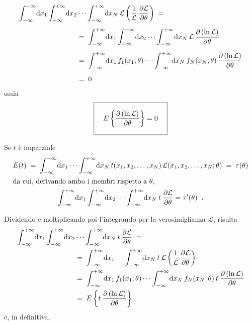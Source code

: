 \begin{equation*}
  \begin{split}
    \int_{-\infty}^{+\infty} \! \de x_1
      \int_{-\infty}^{+\infty} \! \de x_2 &\cdots
      \int_{-\infty}^{+\infty} \! \de x_N \:
      \mathcal{L} \left( \frac{1}{\mathcal{L}} \,
      \frac{\partial \mathcal{L}}{\partial \theta}
      \right) \; = \\[1ex]
    &= \; \int_{-\infty}^{+\infty} \! \de x_1
      \int_{-\infty}^{+\infty} \! \de x_2 \cdots
      \int_{-\infty}^{+\infty} \! \de x_N \:
      \mathcal{L} \, \frac{\partial \left(
      \ln \mathcal{L} \right)}{\partial \theta}
      \\[1ex]
    &= \; \int_{-\infty}^{+\infty} \! \de x_1 \,
      f_1(x_1;\theta) \cdots
      \int_{-\infty}^{+\infty} \! \de x_N \:
      f_N(x_N;\theta) \, \frac{\partial \left(
      \ln \mathcal{L} \right)}{\partial \theta}
      \\[1ex]
    &= \; 0
  \end{split}
\end{equation*}
ossia
\begin{equation} \label{eq:e.crarao1}
  \boxed{ \rule[-6mm]{0mm}{14mm} \quad
    E \left\{ \dfrac{\partial \left(
    \ln \mathcal{L} \right)}{\partial \theta}
    \right\} = 0 \quad }
\end{equation}

Se $t$ \`e imparziale
\begin{gather*}
  E(t) \; = \; \int_{-\infty}^{+\infty} \!
    \de x_1 \cdots \int_{-\infty}^{+\infty} \!
    \de x_N \: t(x_1, x_2,\ldots, x_N) \,
    \mathcal{L}(x_1, x_2,\ldots, x_N ;\theta)
    \; = \; \tau(\theta) \\
  \intertext{da cui, derivando ambo i membri
    rispetto a $\theta$,}
  \int_{-\infty}^{+\infty} \! \de x_1
    \int_{-\infty}^{+\infty} \! \de x_2 \cdots
    \int_{-\infty}^{+\infty} \! \de x_N \:
    t \: \frac{\partial \mathcal{L}}{\partial
    \theta} = \tau ' (\theta) \peq .
\end{gather*}

Dividendo e moltiplicando poi l'integrando per la
verosimiglianza $\mathcal{L}$, risulta
\begin{equation*}
  \begin{split}
    \int_{-\infty}^{+\infty} \! \mathrm{d} x_1
      \int_{-\infty}^{+\infty} \! \mathrm{d} x_2 &\cdots
      \int_{-\infty}^{+\infty} \! \mathrm{d} x_N \:
      t \: \frac{\partial \mathcal{L}}{\partial
      \theta} \; = \\
    &= \; \int_{-\infty}^{+\infty} \! \mathrm{d} x_1
      \cdots \int_{-\infty}^{+\infty} \! \mathrm{d} x_N
      \: t \: \mathcal{L} \left( \frac{1}
      {\mathcal{L}} \, \frac{\partial
      \mathcal{L}}{\partial \theta} \right) \\
    &= \; \int_{-\infty}^{+\infty} \! \mathrm{d} x_1 \,
      f_1(x_1;\theta) \cdots
      \int_{-\infty}^{+\infty} \! \mathrm{d} x_N \:
      f_N(x_N;\theta) \: t \: \frac{\partial
      \left( \ln \mathcal{L} \right)} {\partial
      \theta} \\
    &= \; E \left\{ t \: \frac{\partial \left(
      \ln \mathcal{L} \right)}{\partial \theta}
      \right\}
  \end{split}
\end{equation*}
e, in definitiva,

